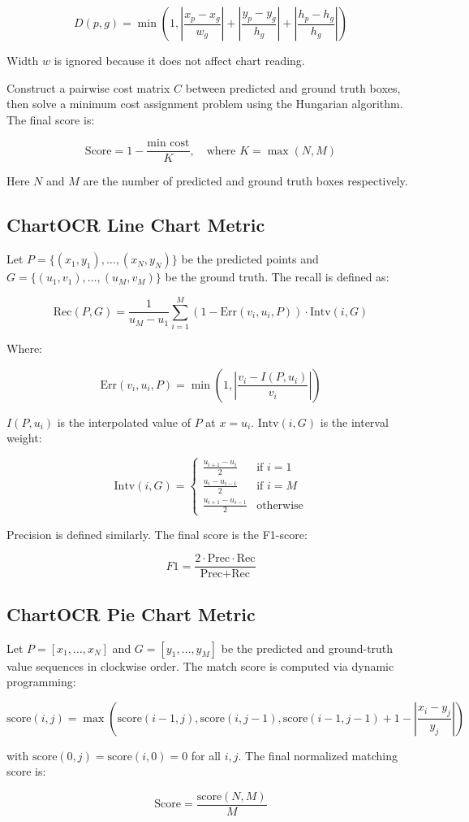 \documentclass[
	letterpaper, %
]{jdf}
\begin{document}
\[
D(p, g) = \min\left(1, \left\lvert \frac{x_p - x_g}{w_g} \right\rvert + \left\lvert \frac{y_p - y_g}{h_g} \right\rvert + \left\lvert \frac{h_p - h_g}{h_g} \right\rvert\right)
\]

Width $w$ is ignored because it does not affect chart reading.

Construct a pairwise cost matrix $C$ between predicted and ground truth boxes, then solve a minimum cost assignment problem using the Hungarian algorithm. The final score is:

\[
\text{Score} = 1 - \frac{\text{min cost}}{K}, \quad \text{where } K = \max(N, M)
\]

Here $N$ and $M$ are the number of predicted and ground truth boxes respectively.

\subsection{ChartOCR Line Chart Metric}

Let $P = \{(x_1, y_1), \ldots, (x_N, y_N)\}$ be the predicted points and $G = \{(u_1, v_1), \ldots, (u_M, v_M)\}$ be the ground truth. The recall is defined as:

\[
\text{Rec}(P, G) = \frac{1}{u_M - u_1} \sum_{i=1}^{M} \left(1 - \text{Err}(v_i, u_i, P)\right) \cdot \text{Intv}(i, G)
\]

Where:

\[
\text{Err}(v_i, u_i, P) = \min\left(1, \left\lvert \frac{v_i - I(P, u_i)}{v_i} \right\rvert\right)
\]

$I(P, u_i)$ is the interpolated value of $P$ at $x = u_i$. $\text{Intv}(i, G)$ is the interval weight:

\[
\text{Intv}(i, G) =
\begin{cases}
\frac{u_{i+1} - u_i}{2} & \text{if } i = 1 \\
\frac{u_i - u_{i-1}}{2} & \text{if } i = M \\
\frac{u_{i+1} - u_{i-1}}{2} & \text{otherwise}
\end{cases}
\]

Precision is defined similarly. The final score is the F1-score:

\[
F1 = \frac{2 \cdot \text{Prec} \cdot \text{Rec}}{\text{Prec} + \text{Rec}}
\]

\subsection{ChartOCR Pie Chart Metric}

Let $P = [x_1, \dots, x_N]$ and $G = [y_1, \dots, y_M]$ be the predicted and ground-truth value sequences in clockwise order. The match score is computed via dynamic programming:

\[
\text{score}(i,j) = \max\left(
\text{score}(i{-}1, j),
\text{score}(i, j{-}1),
\text{score}(i{-}1, j{-}1) + 1 - \left\lvert \frac{x_i - y_j}{y_j} \right\rvert
\right)
\]

with $\text{score}(0, j) = \text{score}(i, 0) = 0$ for all $i, j$. The final normalized matching score is:

\[
\text{Score} = \frac{\text{score}(N, M)}{M}
\]
\end{document}
